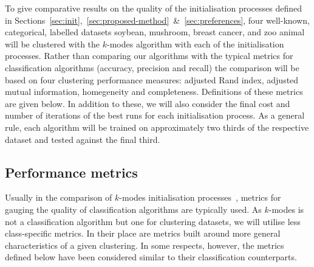 To give comparative results on the quality of the initialisation processes 
defined in
Sections~\ref{sec:init},~\ref{sec:proposed-method}~\&~\ref{sec:preferences},
four well-known, categorical, labelled datasets \- soybean, mushroom, breast
cancer, and zoo animal \- will be clustered with the \(k\)-modes algorithm with
each of the initialisation processes. Rather than comparing our algorithms with
the typical metrics for classification algorithms (accuracy, precision and
recall) the comparison will be based on four clustering performance measures:
adjusted Rand index, adjusted mutual information, homegeneity and completeness.
Definitions of these metrics are given below. In addition to these, we will also
consider the final cost and number of iterations of the best runs for each
initialisation process. As a general rule, each algorithm will be trained on
approximately two thirds of the respective dataset and tested against the final
third.

\subsection{Performance metrics}\label{subsec:metrics}

Usually in the comparison of \(k\)-modes initialisation
processes~\cite{Huang98}\cite{Cao09}, metrics for gauging the quality of
classification algorithms are typically used. As \(k\)-modes is not a
classification algorithm but one for clustering datasets, we will utilise less
class-specific metrics. In their place are metrics built around more general
characteristics of a given clustering. In some respects, however, the metrics
defined below have been considered similar to their classification
counterparts.\\

